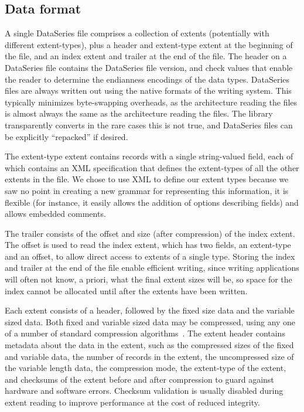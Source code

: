 \documentclass{acm_proc_article-sp}
\begin{document}
\subsection{Data format}

A single DataSeries file comprises a collection of extents
(potentially with different extent-types), plus a header and
extent-type extent at the beginning of the file, and an index extent
and trailer at the end of the file. The header on a DataSeries file 
contains the DataSeries
file version, and check values that enable the reader to determine the
endianness encodings of the data types.  DataSeries files are always
written out using the native formats of the writing system. This 
typically minimizes byte-swapping overheads, as the architecture 
reading the files is almost always the same as the architecture reading
the files. The library transparently converts in the rare cases this
is not true, and DataSeries files can be explicitly ``repacked'' if desired. 

The extent-type extent contains records with a single string-valued
field, each of which contains an XML specification that defines the
extent-types of all the other extents in the file. We chose to use XML
to define our extent types because we saw no point in creating a new
grammar for representing this information, it is flexible (for
instance, it easily allows the addition of options describing
fields) and allows embedded comments.

The trailer
consists of the offset and size (after compression) of the index
extent.  The offset is used to read the index extent, which has two
fields, an extent-type and an offset, to allow direct access to
extents of a single type. Storing the index and trailer at the end
of the file enable efficient writing, since writing applications will
often not know, a priori, what the final extent sizes will be, so space 
for the index cannot be allocated until after the extents have been written.

Each extent consists of a header, followed by the fixed
size data and the variable sized data.  Both fixed and variable sized
data may be compressed, using any one of a number of standard
compression algorithms~\cite{GZIP,BZIP,LZF,LZO}.  The extent header contains
metadata about the data in the extent, such as the compressed sizes of
the fixed and variable data, the number of records in the extent, the
uncompressed size of the variable length data, the compression mode,
the extent-type of the extent, and checksums of the extent before and
after compression to guard against hardware and software errors.
Checksum validation is usually disabled during extent reading to improve
performance at the cost of reduced integrity.
\end{document}
